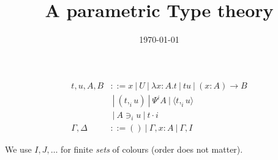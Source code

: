 \documentclass[10pt,a4paper]{article}
\title{A parametric Type theory}
\author{}
\date{\today}
\newcommand\CP[3]{(#2,_{#1} #3)}
\newcommand\param[1]{\!\cdot\!#1}
\newcommand\op[1]{∋_{#1}}
\newcommand\ip[1]{Ψ^{#1}}
\newcommand\fp[3]{⟨#2 ,_{#1} #3⟩}
\begin{document}
\maketitle


\begin{definition}
  
  \begin{align*}
    t,u,A,B & ::= x ~|~ U ~|~ λx:A. t      ~|~ t u ~|~ (x:A) → B \\
            & ~|~ \CP i t u  ~|~ \ip i A  ~|~ \fp i t u \\
            & ~|~ A \op i u ~|~ t \param i  \\
    \Gamma,\Delta & ::= () ~|~ \Gamma,x:A ~|~ \Gamma,I
  \end{align*}
\end{definition}

We use $I,J,…$ for finite {\em sets} of colours (order does not matter).
\end{document}
